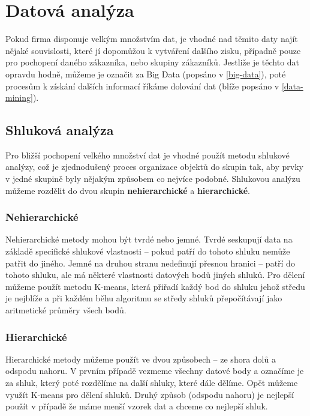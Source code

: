 \section{Datová analýza}
\par Pokud firma disponuje velkým množstvím dat, je vhodné nad těmito daty najít nějaké souvislosti, které jí dopomůžou k vytváření dalšího zisku, případně pouze pro pochopení daného zákazníka, nebo skupiny zákazníků. Jestliže je těchto dat opravdu hodně, můžeme je označit za Big Data (popsáno v \ref{big-data}), poté procesům k získání dalších informací říkáme dolování dat (blíže popsáno v \ref{data-mining}).

\subsection{Shluková analýza}
\par Pro bližší pochopení velkého množství dat je vhodné použít metodu shlukové analýzy, což je zjednodušený proces organizace objektů do skupin tak, aby prvky v jedné skupině byly nějakým způsobem co nejvíce podobné. Shlukovou analýzu můžeme rozdělit do dvou skupin \textbf{nehierarchické} a \textbf{hierarchické}.

\subsubsection{Nehierarchické}
\par Nehierarchické metody mohou být tvrdé nebo jemné. Tvrdé seskupují data na základě specifické shlukové vlastnosti -- pokud patří do tohoto shluku nemůže patřit do jiného. Jemné na druhou stranu nedefinují přesnou hranici -- patří do tohoto shluku, ale má některé vlastnosti datových bodů jiných shluků. Pro dělení můžeme použít metodu K-means, která přiřadí každý bod do shluku jehož středu je nejblíže a při každém běhu algoritmu se středy shluků přepočítávají jako aritmetické průměry všech bodů. \cite{big-data-anayitics}

\subsubsection{Hierarchické}
\par Hierarchické metody můžeme použít ve dvou způsobech -- ze shora dolů a odspodu nahoru. V prvním případě vezmeme všechny datové body a označíme je za shluk, který poté rozdělíme na další shluky, které dále dělíme. Opět můžeme využít K-means pro dělení shluků. Druhý způsob (odspodu nahoru) je nejlepší použít v případě že máme menší vzorek dat a chceme co nejlepší shluk. \cite{big-data-anayitics}

